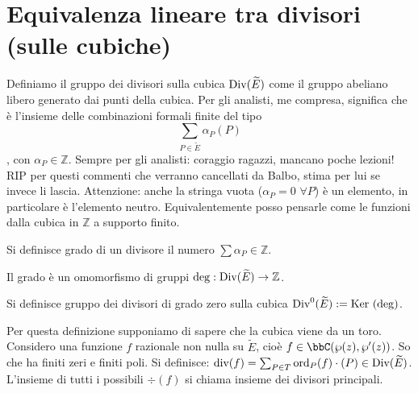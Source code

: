 \section{Equivalenza lineare tra divisori (sulle cubiche)}

\begin{definizione}
Definiamo il gruppo dei divisori sulla cubica $\mbox{Div}(\widetilde{E})$ come il gruppo abeliano libero generato dai punti della cubica. Per gli analisti, me compresa, significa che è l'insieme delle combinazioni formali finite del tipo $$\sum_{P \in \widetilde{E}} \alpha_P(P)$$,
con $\alpha_P \in \mathbb{Z}$.
Sempre per gli analisti: coraggio ragazzi, mancano poche lezioni!
RIP per questi commenti che verranno cancellati da Balbo, stima per lui se invece li lascia.
Attenzione: anche la stringa vuota ($\alpha_P=0$ $\forall P$) è un elemento, in particolare è l'elemento neutro.
Equivalentemente posso pensarle come le funzioni dalla cubica in $\mathbb{Z}$ a supporto finito.
\end{definizione}

\begin{definizione}
Si definisce grado di un divisore il numero $\sum \alpha_P \in \mathbb{Z}$.
\end{definizione}

\begin{osservazione}Il grado è un omomorfismo di gruppi $\deg: \mbox{Div}(\widetilde{E}) \rightarrow \mathbb{Z}$.
\end{osservazione}

\begin{definizione}
Si definisce gruppo dei divisori di grado zero sulla cubica $\mbox{Div}^0(\widetilde{E}) := \mbox{Ker }(\deg)$.
\end{definizione}

\begin{definizione}
Per questa definizione supponiamo di sapere che la cubica viene da un toro.
Considero una funzione $f$ razionale non nulla su $\widetilde{E}$, cioè $f \in \bbC(\wp(z),\wp'(z))$. So che ha finiti zeri e finiti poli.
Si definisce: $\mbox{div}(f) = \sum_{P\in T} \text{ord}_P(f) \cdot (P) \in \mbox{Div}(\widetilde E)$.
L'insieme di tutti i possibili $\div(f)$ si chiama insieme dei divisori principali.
\end{definizione}

